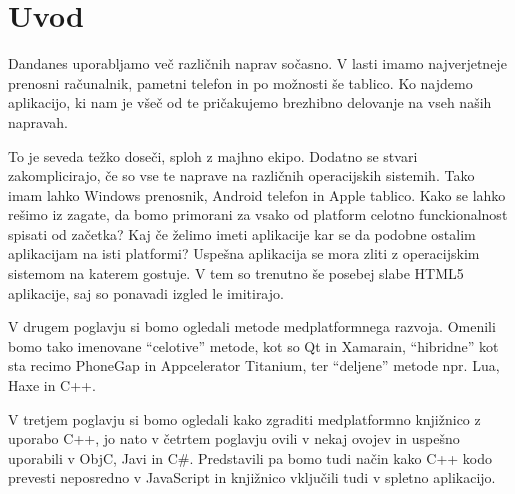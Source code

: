 \graphicspath{{img/}}







\chapter{Uvod}
\label{chap:introduction}


Dandanes uporabljamo več različnih naprav sočasno. V lasti imamo najverjetneje prenosni računalnik, pametni telefon in po možnosti še tablico. Ko najdemo aplikacijo, ki nam je všeč od te pričakujemo brezhibno delovanje na vseh naših napravah.

To je seveda težko doseči, sploh z majhno ekipo. Dodatno se stvari zakomplicirajo, če so vse te naprave na različnih operacijskih sistemih. Tako imam lahko Windows prenosnik, Android telefon in Apple tablico. Kako se lahko rešimo iz zagate, da bomo primorani za vsako od platform celotno funckionalnost spisati od začetka? Kaj če želimo imeti aplikacije kar se da podobne ostalim aplikacijam na isti platformi? Uspešna aplikacija se mora zliti z operacijskim sistemom na katerem gostuje. V tem so trenutno še posebej slabe HTML5 aplikacije, saj so ponavadi izgled le imitirajo.

V drugem poglavju si bomo ogledali metode medplatformnega razvoja. Omenili bomo tako imenovane ``celotive'' metode, kot so Qt in Xamarain, ``hibridne'' kot sta recimo PhoneGap in Appcelerator Titanium, ter ``deljene'' metode npr. Lua, Haxe in C++.

V tretjem poglavju si bomo ogledali kako zgraditi medplatformno knjižnico z uporabo C++, jo nato v četrtem poglavju ovili v nekaj ovojev in uspešno uporabili v ObjC, Javi in C\#. Predstavili pa bomo tudi način kako C++ kodo prevesti neposredno v JavaScript in knjižnico vključili tudi v spletno aplikacijo.
